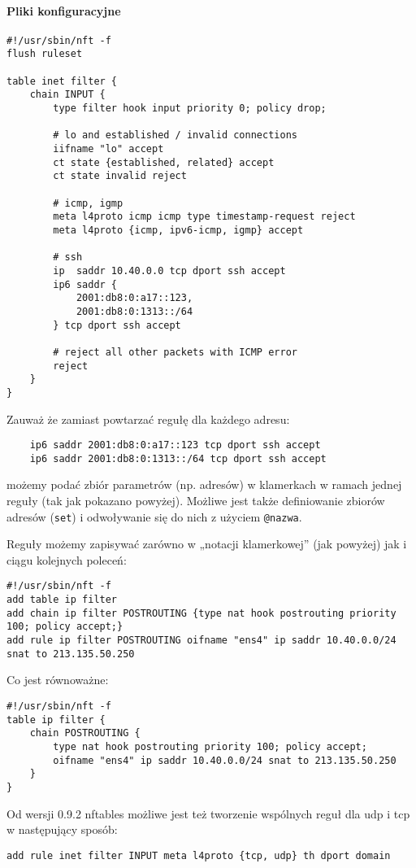 \paragraph{Pliki konfiguracyjne}

\begin{Verbatim}
#!/usr/sbin/nft -f
flush ruleset

table inet filter {
	chain INPUT {
		type filter hook input priority 0; policy drop;
		
		# lo and established / invalid connections
		iifname "lo" accept
		ct state {established, related} accept
		ct state invalid reject
		
		# icmp, igmp
		meta l4proto icmp icmp type timestamp-request reject
		meta l4proto {icmp, ipv6-icmp, igmp} accept
		
		# ssh
		ip  saddr 10.40.0.0 tcp dport ssh accept
		ip6 saddr {
			2001:db8:0:a17::123,
			2001:db8:0:1313::/64
		} tcp dport ssh accept
		
		# reject all other packets with ICMP error
		reject
	}
}
\end{Verbatim}

Zauważ że zamiast powtarzać regułę dla każdego adresu:
\begin{Verbatim}
	ip6 saddr 2001:db8:0:a17::123 tcp dport ssh accept
	ip6 saddr 2001:db8:0:1313::/64 tcp dport ssh accept
\end{Verbatim}
możemy podać zbiór parametrów (np. adresów) w klamerkach w ramach jednej reguły (tak jak pokazano powyżej).
Możliwe jest także definiowanie zbiorów adresów (\Verb$set$) i odwoływanie się do nich z użyciem \Verb$@nazwa$.

Reguły możemy zapisywać zarówno w „notacji klamerkowej” (jak powyżej) jak i ciągu kolejnych poleceń:

\begin{Verbatim}
#!/usr/sbin/nft -f
add table ip filter
add chain ip filter POSTROUTING {type nat hook postrouting priority 100; policy accept;}
add rule ip filter POSTROUTING oifname "ens4" ip saddr 10.40.0.0/24 snat to 213.135.50.250
\end{Verbatim}

Co jest równoważne:

\begin{Verbatim}
#!/usr/sbin/nft -f
table ip filter {
	chain POSTROUTING {
		type nat hook postrouting priority 100; policy accept;
		oifname "ens4" ip saddr 10.40.0.0/24 snat to 213.135.50.250
	}
}
\end{Verbatim}

Od wersji 0.9.2 nftables możliwe jest też tworzenie wspólnych reguł dla udp i tcp w następujący sposób:
\begin{Verbatim}
add rule inet filter INPUT meta l4proto {tcp, udp} th dport domain
\end{Verbatim}
